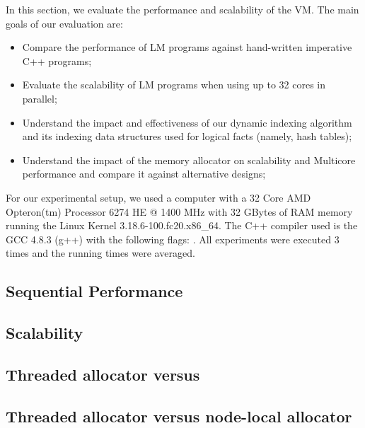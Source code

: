 In this section, we evaluate the performance and scalability of the VM. The main
goals of our evaluation are:

\begin{itemize}
   \item Compare the performance of LM programs against hand-written
      imperative C++ programs;
   \item Evaluate the scalability of LM programs when using up to 32 cores
      in parallel;
   \item Understand the impact and effectiveness of our dynamic indexing
      algorithm and its indexing data structures used for logical facts (namely,
      hash tables);
   \item Understand the impact of the memory allocator on scalability and
      Multicore performance and compare it against alternative designs;
\end{itemize}

For our experimental setup, we used a computer with a 32 Core AMD
Opteron(tm) Processor 6274 HE $@$ 1400 MHz with 32 GBytes of RAM memory running
the Linux Kernel 3.18.6-100.fc20.x86\_64. The C++ compiler used is the GCC
4.8.3 (g++) with the following  flags: .  All experiments were executed 3 times and the running times
were averaged.

\subsection{Sequential Performance}\label{section:implementation:performance}


\subsection{Scalability}


\clearpage

\subsection{Threaded allocator versus }



\subsection{Threaded allocator versus node-local allocator}\label{section:implementation:alternative_allocator}

